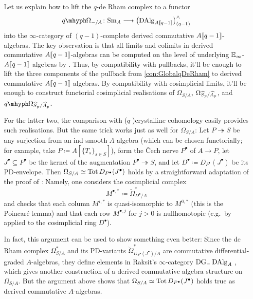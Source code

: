 \documentclass[DIV=12,numbers=enddot,leqno,bibliography=totoc]{scrartcl}
\begin{document}
	\begin{numpar}\label{par:DerivedCommutativeLift}
		Let us explain how to lift the $q$-de Rham complex to a functor
		\begin{equation*}
			\qOmega_{-/A}\colon \cat{Sm}_A\longrightarrow \bigl(\DAlg_{A\qpower}\bigr)_{(q-1)}^\complete
		\end{equation*}
		into the $\infty$-category of $(q-1)$-complete derived commutative $A\llbracket q-1\rrbracket$-algebras. The key observation is that all limits and colimits in derived commutative $A\llbracket q-1\rrbracket$-algebras can be computed on the level of underlying $\mathbb{E}_\infty$-$A\llbracket q-1\rrbracket$-algebras by \cite[Proposition~]{RaksitFilteredCircle}. Thus, by compatibility with pullbacks, it'll be enough to lift the three components of the pullback from \cref{con:GlobalqDeRham} to derived commutative $A\llbracket q-1\rrbracket$-algebras. By compatibility with cosimplicial limits, it'll be enough to construct functorial cosimplicial realisations of $\Omega_{S/A}$, $\Omega_{\smash{\widehat{S}}_p/\smash{\widehat{A}}_p}$, and $\qOmega_{\smash{\widehat{S}}_p/\smash{\widehat{A}}_p}$.
		
		For the latter two, the comparison with ($q$-)crystalline cohomology easily provides such realisations. But the same trick works just as well for $\Omega_{S/A}$: Let $P\twoheadrightarrow S$ be any surjection from an ind-smooth-$A$-algebra (which can be chosen functorially; for example, take $P\coloneqq A[\{T_s\}_{s\in S}]$), form the \v Cech nerve $P^\bullet$ of $A\rightarrow P$, let $J^\bullet\subseteq P^\bullet$ be the kernel of the augmentation $P^\bullet\twoheadrightarrow S$, and let $D^\bullet\coloneqq D_{P^\bullet}(J^\bullet)$ be its PD-envelope. Then $\Omega_{S/A}\simeq \operatorname{Tot} D_{P^\bullet}(J^\bullet)$ holds by a straightforward adaptation of the proof of \cite[Theorem~]{Prismatic}: Namely, one considers the cosimplicial complex
		\begin{equation*}
			M^{\bullet,*}\coloneqq \breve{\Omega}_{D^\bullet/A}^*
		\end{equation*}
		and checks that each column $M^{i,*}$ is quasi-isomorphic to $M^{0,*}$ (this is the Poincaré lemma) and that each row $M^{\bullet,j}$ for $j>0$ is nullhomotopic (e.g.\ by \cite[Tag~]{Stacks} applied to the cosimplicial ring $D^\bullet$).
		
		In fact, this argument can be used to show something even better: Since the de Rham complex $\Omega_{S/A}^*$ and its PD-variants $\breve{\Omega}_{D_{P^\bullet}(J^\bullet)/A}^*$ are commutative differential-graded $A$-algebras, they define elements in Raksit's $\infty$-category $\mathrm{DG}_-\operatorname{DAlg}_{A}$ \cite[Definition~]{RaksitFilteredCircle}, which gives another construction of a derived commutative algebra structure on $\Omega_{S/A}$. But the argument above shows that $\Omega_{S/A}\simeq \operatorname{Tot} D_{P^\bullet}(J^\bullet)$ holds true as derived commutative $A$-algebras.
	\end{numpar}
	
\end{document}
